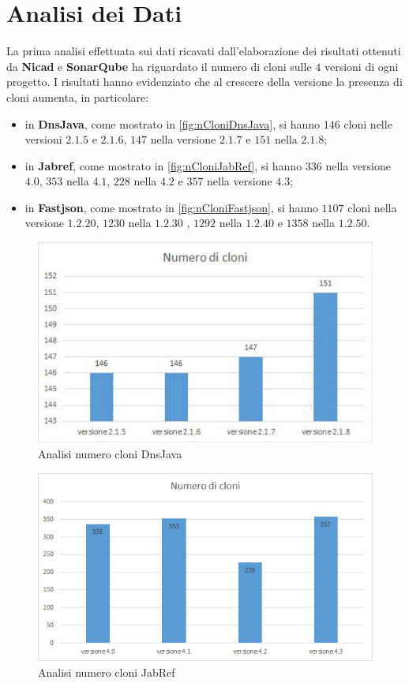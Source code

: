 \section{Analisi dei Dati}
La prima analisi effettuata sui dati ricavati dall'elaborazione dei risultati ottenuti da \textbf{Nicad} e \textbf{SonarQube} ha riguardato il numero di cloni sulle $4$ versioni di ogni progetto. I risultati hanno evidenziato che al crescere della versione la presenza di cloni aumenta, in particolare:
\begin{itemize}
	\item in \textbf{DnsJava}, come mostrato in \autoref{fig:nCloniDnsJava}, si hanno $146$ cloni nelle versioni $2.1.5$ e $2.1.6$, $147$ nella versione $2.1.7$ e $151$ nella $2.1.8$;
	\item in \textbf{Jabref}, come mostrato in \autoref{fig:nCloniJabRef}, si hanno $336$ nella versione $4.0$, $353$ nella $4.1$, $228$ nella $4.2$ e $357$ nella versione $4.3$;
	\item in \textbf{Fastjson}, come mostrato in \autoref{fig:nCloniFastjson}, si hanno $1107$ cloni nella versione $1.2.20$, $1230$ nella $1.2.30$ , $1292$ nella $1.2.40$ e $1358$ nella $1.2.50$.
\end{itemize}
\begin{figure}[h]
	\centering
	\includegraphics[scale=0.7, trim = 0cm 0cm 0cm 0cm, clip=true]{Grafici_dnsJava/NumeroCloni.pdf}
	\caption{Analisi numero cloni DnsJava}
	\label{fig:nCloniDnsJava}
\end{figure}
\begin{figure}[h]
	\centering
	\includegraphics[scale=0.58, trim = 0cm 0cm 0cm 0cm, clip=true]{Grafici_jabRef/NumeroCloni.png}
	\caption{Analisi numero cloni JabRef}
	\label{fig:nCloniJabRef}
\end{figure}

